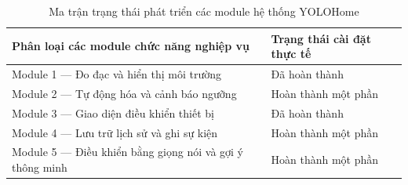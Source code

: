 \begin{table}[H]
\centering
\caption{Ma trận trạng thái phát triển các module hệ thống YOLOHome}
\label{tab:module-status}
\begin{tabular}{p{8.5cm} l}
\toprule
\textbf{Phân loại các module chức năng nghiệp vụ} & \textbf{Trạng thái cài đặt thực tế} \\
\midrule
Module 1 --- Đo đạc và hiển thị môi trường & Đã hoàn thành \\
Module 2 --- Tự động hóa và cảnh báo ngưỡng & Hoàn thành một phần \\
Module 3 --- Giao diện điều khiển thiết bị & Đã hoàn thành \\
Module 4 --- Lưu trữ lịch sử và ghi sự kiện & Hoàn thành một phần \\
Module 5 --- Điều khiển bằng giọng nói và gợi ý thông minh & Hoàn thành một phần \\
\bottomrule
\end{tabular}
\end{table}